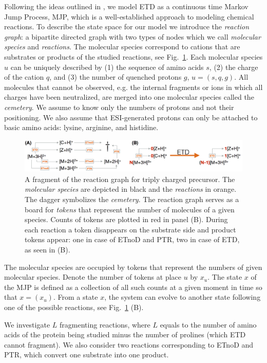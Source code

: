 \documentclass{llncs}
\begin{document}
Following the ideas outlined in \cite{Gambin2010}, we model ETD as a continuous time Markov Jump Process, MJP, which is a well-established approach to modeling chemical reactions.
To describe the state space for our model we introduce the \textit{reaction graph}: a bipartite directed graph with two types of nodes which we call \textit{molecular species} and \textit{reactions}. The molecular species correspond to cations that are substrates or products of the studied reactions, see Fig.~\ref{img::petrinet}. Each molecular species $u$ can be uniquely described by (1) the sequence of amino acids $s$, (2) the charge of the cation $q$, and (3) the number of quenched protons $g$, $u = (s,q,g)$. All molecules that cannot be observed, e.g. the internal fragments or ions in which all charges have been neutralized, are merged into one molecular species called the \textit{cemetery}. We assume to know only the numbers of protons and not their positioning. We also assume that ESI-generated protons can only be attached to basic amino acids: lysine, arginine, and histidine.
\begin{figure}[h]
        \center
        \includegraphics[width=\textwidth]{petrinet.png}
        \caption{A fragment of the reaction graph for triply charged precursor. The \textit{molecular species} are depicted in black and the \textit{reactions} in orange. The dagger symbolizes the \textit{cemetery}. The reaction graph serves as a board for \textit{tokens} that represent the number of molecules of a given species. Counts of tokens are plotted in red in panel (B). During each reaction a token disappears on the substrate side and product tokens appear: one in case of ETnoD and PTR, two in case of ETD, as seen in (B).}\label{img::petrinet}
\end{figure}

The molecular species are occupied by tokens that represent the numbers of given molecular species.
Denote the number of tokens at place $u$ by $x_u$. The state $x$ of the MJP is defined as a collection of all such counts at a given moment in time so that $x = (x_u)$.  From a state $x$, the system can evolve to another state following one of the possible reactions, see Fig.~\ref{img::petrinet} (B).

We investigate $L$ fragmenting reactions, where $L$ equals to the number of amino acids of the protein being studied minus the number of prolines (which ETD cannot fragment). We also consider two reactions corresponding to ETnoD and PTR, which convert one substrate into one product.
\end{document}
